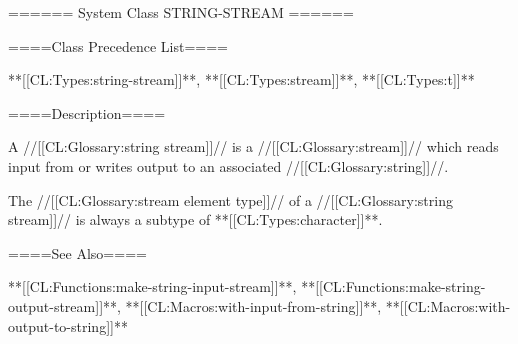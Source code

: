 ====== System Class STRING-STREAM ======

====Class Precedence List====

**[[CL:Types:string-stream]]**, **[[CL:Types:stream]]**, **[[CL:Types:t]]**

====Description====

A //[[CL:Glossary:string stream]]// is a //[[CL:Glossary:stream]]// which reads input from or writes output to an associated //[[CL:Glossary:string]]//.

The //[[CL:Glossary:stream element type]]// of a //[[CL:Glossary:string stream]]// is always a subtype of **[[CL:Types:character]]**.

====See Also====

**[[CL:Functions:make-string-input-stream]]**, **[[CL:Functions:make-string-output-stream]]**, **[[CL:Macros:with-input-from-string]]**, **[[CL:Macros:with-output-to-string]]**

 
